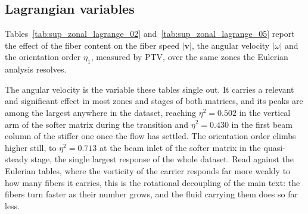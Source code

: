 \documentclass[%
  aip,
  pof,
  reprint,
  floatfix
]{revtex4-2}
\begin{document}
\subsection{Lagrangian variables}

Tables~\ref{tab:sup_zonal_lagrange_02} and~\ref{tab:sup_zonal_lagrange_05} report the effect of the fiber content on the fiber speed $|\bm{v}|$, the angular velocity $|\omega|$ and the orientation order $\eta_1$, measured by PTV, over the same zones the Eulerian analysis resolves.

The angular velocity is the variable these tables single out. It carries a relevant and significant effect in most zones and stages of both matrices, and its peaks are among the largest anywhere in the dataset, reaching $\eta^2 = 0.502$ in the vertical arm of the softer matrix during the transition and $\eta^2 = 0.430$ in the first beam column of the stiffer one once the flow has settled. The orientation order climbs higher still, to $\eta^2 = 0.713$ at the beam inlet of the softer matrix in the quasi-steady stage, the single largest response of the whole dataset. Read against the Eulerian tables, where the vorticity of the carrier responds far more weakly to how many fibers it carries, this is the rotational decoupling of the main text: the fibers turn faster as their number grows, and the fluid carrying them does so far less.
\end{document}
